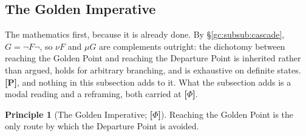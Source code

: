 \documentclass[11pt]{article}
\numberwithin{equation}{section}
\theoremstyle{plain}
\theoremstyle{definition}
\newtheorem{principle}{Principle}
\theoremstyle{remark}
\begin{document}
%

\subsection{The Golden Imperative}\label{ac:sub:imperative}

The mathematics first, because it is already done. By \S\ref{gc:subsub:cascade}, $G = \neg F \neg$, so $\nu F$ and $\mu G$ are complements outright: the dichotomy between reaching the Golden Point and reaching the Departure Point is inherited rather than argued, holds for arbitrary branching, and is exhaustive on definite states. \textbf{[P]}, and nothing in this subsection adds to it. What the subsection adds is a modal reading and a reframing, both carried at \textbf{[$\Phi$]}.

\begin{principle}[The Golden Imperative; \textbf{[$\Phi$]}]\label{ac:prin:imperative}
Reaching the Golden Point is the only route by which the Departure Point is avoided.
\end{principle}
\end{document}
